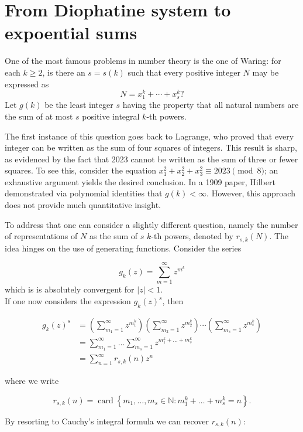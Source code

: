 \section{From Diophatine system to expoential sums}
One of the most famous problems in number theory is the one of Waring: for each $k \geq 2$, is there an $s=s(k)$ such that every positive integer $N$ may be expressed as
\begin{equation}
N=x_{1}^{k}+\cdots+x_{s}^{k} ?
\end{equation}
Let $g(k)$ be the least integer $s$ having the property that all natural numbers are the sum of at most $s$ positive integral $k$-th powers.

The first instance of this question goes back to Lagrange, who proved that every integer can be written as the sum of four squares of integers. This result is sharp, as evidenced by the fact that 2023 cannot be written as the sum of three or fewer squares. To see this, consider the equation $x_{1}^2 + x_{2}^2 + x_{3}^2 \equiv 2023 \pmod{8}$; an exhaustive argument yields the desired conclusion. In a 1909 paper, Hilbert demonstrated via polynomial identities that $g(k) < \infty$. However, this approach does not provide much quantitative insight.

To address that one can consider a slightly different question, namely the number of representations of $N$ as the sum of $s$ $k$-th powers, denoted by $r_{s,k}(N)$. The idea hinges on the use of generating functions. Consider the series

$$
g_{k}(z)=\sum_{m=1}^{\infty} z^{m^{k}}
$$
which is is absolutely convergent for $|z|<1$.\\
If one now considers the expression $g_{k}(z)^{s}$, then 

$$
\begin{aligned}
g_{k}(z)^{s} & =\left(\sum_{m_{1}=1}^{\infty} z^{m_{1}^{k}}\right)\left(\sum_{m_{2}=1}^{\infty} z^{m_{2}^{k}}\right) \cdots\left(\sum_{m_{s}=1}^{\infty} z^{m_{s}^{k}}\right) \\
& =\sum_{m_{1}=1}^{\infty} \ldots \sum_{m_{s}=1}^{\infty} z^{m_{1}^{k}+\ldots+m_{s}^{k}} \\
& =\sum_{n=1}^{\infty} r_{s, k}(n) z^{n}
\end{aligned}
$$

where we write

$$
r_{s, k}(n)=\operatorname{card}\left\{m_{1}, \ldots, m_{s} \in \mathbb{N}: m_{1}^{k}+\ldots+m_{s}^{k}=n\right\}.
$$

By resorting to Cauchy's integral formula we can recover $r_{s, k}(n)$:

